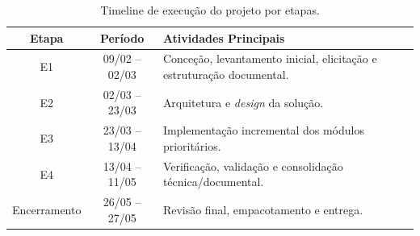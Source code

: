 \begin{table}[H]
\centering
\small
\begin{tabular}{|c|c|p{8cm}|}
\hline
\textbf{Etapa} & \textbf{Período} & \textbf{Atividades Principais} \\
\hline
E1 & 09/02 -- 02/03 & Conceção, levantamento inicial, elicitação e estruturação documental. \\
\hline
E2 & 02/03 -- 23/03 & Arquitetura e \textit{design} da solução. \\
\hline
E3 & 23/03 -- 13/04 & Implementação incremental dos módulos prioritários. \\
\hline
E4 & 13/04 -- 11/05 & Verificação, validação e consolidação técnica/documental. \\
\hline
Encerramento & 26/05 -- 27/05 & Revisão final, empacotamento e entrega. \\
\hline
\end{tabular}
\caption{Timeline de execução do projeto por etapas.}
\label{tab:timeline_execucao}
\end{table}